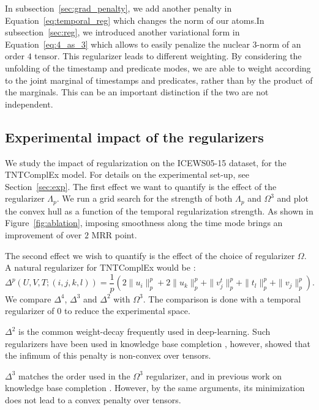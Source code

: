 \documentclass{article}
\begin{document}
In subsection~\ref{sec:grad_penalty}, we add another penalty in Equation~\eqref{eq:temporal_reg} which changes the norm of our atoms.In subsection~\ref{sec:reg}, we introduced another variational form in Equation~\eqref{eq:4_as_3} which allows to easily penalize the nuclear $3$-norm of an order $4$ tensor. This regularizer leads to different weighting. By considering the unfolding of the timestamp and predicate modes, we are able to weight according to the joint marginal of timestamps and predicates, rather than by the product of the marginals. This can be an important distinction if the two are not independent.

\subsection{Experimental impact of the regularizers}
We study the impact of regularization on the ICEWS05-15 dataset, for the TNTComplEx model. For details on the experimental set-up, see Section~\ref{sec:exp}. The first effect we want to quantify is the effect of the regularizer $\Lambda_p$. We run a grid search for the strength of both $\Lambda_p$ and $\Omega^{3}$ and plot the convex hull as a function of the temporal regularization strength. As shown in Figure~\ref{fig:ablation}, imposing smoothness along the time mode brings an improvement of over $2$ MRR point.

The second effect we wish to quantify is the effect of the choice of regularizer $\Omega$. A natural regularizer for TNTComplEx would be : 
\begin{equation}
    \Delta^p(U, V, T; (i,j,k,l)) = \frac{1}{p}\left(2\|u_i\|_p^p + 2\|u_k\|_p^p + \|v^t_j\|_p^p + \|t_l\|_p^p + \|v_j\|_p^p\right).
\end{equation}
We compare $\Delta^4$, $\Delta^3$ and $\Delta^2$ with $\Omega^3$. The comparison is done with a temporal regularizer of $0$ to reduce the experimental space.

$\Delta^2$ is the common weight-decay frequently used in deep-learning. Such regularizers have been used in knowledge base completion \citep{nickel_three-way_2011, nickel_holographic_2015, trouillon_complex_2016}, however, \citet{lacroix2018canonical} showed that the infimum of this penalty is non-convex over tensors.

$\Delta^3$ matches the order used in the $\Omega^3$ regularizer, and in previous work on knowledge base completion \citep{lacroix2018canonical}. However, by the same arguments, its minimization does not lead to a convex penalty over tensors.
\end{document}
